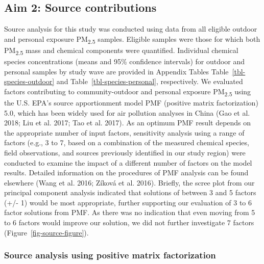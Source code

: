 \documentclass[
  letterpaper,
  DIV=11,
  numbers=noendperiod]{scrartcl}
\makeatletter
\renewenvironment{table}%
   {\renewcommand\familydefault\sfdefault
    \@float{table}}
   {\end@float}
\makeatother
\begin{document}
\begin{table}
{}

\end{table}%

\subsection{Aim 2: Source
contributions}\label{aim-2-source-contributions}

Source analysis for this study was conducted using data from all
eligible outdoor and personal exposure PM\textsubscript{2.5} samples.
Eligible samples were those for which both PM\textsubscript{2.5} mass
and chemical components were quantified. Individual chemical species
concentrations (means and 95\% confidence intervals) for outdoor and
personal samples by study wave are provided in Appendix Tables
Table~\ref{tbl-species-outdoor} and Table~\ref{tbl-species-personal},
respectively. We evaluated factors contributing to
community-outdoor and personal exposure PM\textsubscript{2.5} using the
U.S. EPA's source apportionment model PMF (positive matrix
factorization) 5.0, which has been widely used for air pollution
analyses in China (Gao et al. 2018; Liu et al. 2017; Tao et al. 2017).
As an optimum PMF result depends on the appropriate number of input
factors, sensitivity analysis using a range of factors (e.g., 3 to 7,
based on a combination of the measured chemical species, field
observations, and sources previously identified in our study region)
were conducted to examine the impact of a different number of factors on
the model results. Detailed information on the procedures of PMF
analysis can be found elsewhere (Wang et al. 2016; Zíková et al. 2016).
Briefly, the scree plot from our principal component analysis indicated
that solutions of between 3 and 5 factors (+/- 1) would be most
appropriate, further supporting our evaluation of 3 to 6 factor
solutions from PMF. As there was no indication that even moving from 5
to 6 factors would improve our solution, we did not further investigate
7 factors (Figure~\ref{fig-source-figure}).

\subsubsection{Source analysis using positive matrix
factorization}\label{source-analysis-using-positive-matrix-factorization}
\end{document}
